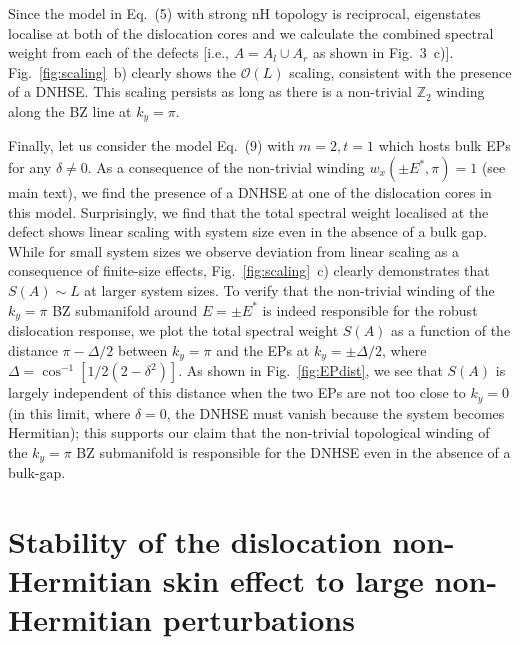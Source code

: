 \documentclass[prb,reprint,twocolumn,preprintnumbers,amsmath,amssymb,showpacs,nofootinbib,superscriptaddress]{revtex4-2}
\begin{document}
Since the model in Eq.~(5) with strong nH topology is reciprocal, eigenstates localise at both of the dislocation cores and we calculate the combined spectral weight from each of the defects [i.e., $A = A_l \cup A_r$ as shown in Fig.~3~c)]. Fig.~\ref{fig:scaling}~b) clearly shows the $\mathcal{O}(L)$ scaling, consistent with the presence of a DNHSE. This scaling persists as long as there is a non-trivial $\mathbb{Z}_2$ winding along the BZ line at $k_y = \pi$. 

Finally, let us consider the model Eq.~(9) with $m=2, t=1$ which hosts bulk EPs for any $\delta \neq 0$. As a consequence of the non-trivial winding $w_x(\pm E^*,\pi) = 1$ (see main text), we find the presence of a DNHSE at one of the dislocation cores in this model. Surprisingly, we find that the total spectral weight localised at the defect shows linear scaling with system size even in the absence of a bulk gap. While for small system sizes we observe deviation from linear scaling as a consequence of finite-size effects, Fig.~\ref{fig:scaling}~c) clearly demonstrates that $S(A) \sim L$ at larger system sizes. To verify that the non-trivial winding of the $k_y = \pi$ BZ submanifold around $E = \pm E^*$ is indeed responsible for the robust dislocation response, we plot the total spectral weight $S(A)$ as a function of the distance $\pi - \Delta/2$ between $k_y = \pi$ and the EPs at $k_y = \pm \Delta/2$, where $\Delta = \cos^{-1}\left[1/2 (2-\delta^2) \right]$. As shown in Fig.~\ref{fig:EPdist}, we see that $S(A)$ is largely independent of this distance when the two EPs are not too close to $k_y=0$ (in this limit, where $\delta = 0$, the DNHSE must vanish because the system becomes Hermitian); this supports our claim that the non-trivial topological winding of the $k_y = \pi$ BZ submanifold is responsible for the DNHSE even in the absence of a bulk-gap.


\section{Stability of the dislocation non-Hermitian skin effect to large non-Hermitian perturbations}
\label{sec:stability}
\end{document}
